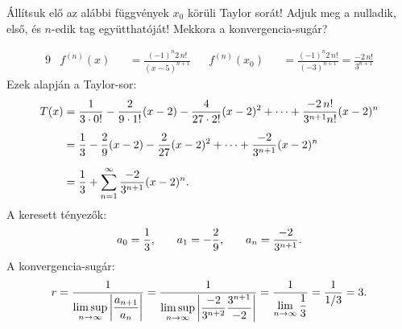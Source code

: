 \documentclass[exercise]{math-standalone}
\begin{document}
\begin{exercise}{%
    Állítsuk elő az alábbi függvények $x_0$ körüli Taylor sorát!
    Adjuk meg a nulladik, első, és $n$-edik tag együtthatóját! Mekkora a
    konvergencia-sugár?
  }
{\begin{enumerate}[a)]
\begin{alignat*}{9}
               & f^{(n)}(x) &  & = \frac{(-1)^n 2 \, n!}{(x-5)^{n+1}} &  & f^{(n)}(x_0) &  & = \frac{(-1)^n 2 \, n!}{(-3)^{n+1}} = \frac{-2 \, n!}{3^{n+1}}
            \end{alignat*}
            Ezek alapján a Taylor-sor:
            \begin{align*}
              T(x)
               & = \frac{1}{3 \cdot 0!}
              - \frac{2}{9 \cdot 1!} (x - 2)
              - \frac{4}{27\cdot 2!} (x - 2)^2
              + \dots
              + \frac{-2 \, n!}{3^{n+1} n!} (x - 2)^n
              \\[2mm]
               & = \frac{1}{3}
              - \frac{2}{9} (x - 2)
              - \frac{2}{27} (x - 2)^2
              + \dots
              + \frac{-2}{3^{n+1}} (x - 2)^n
              \\[2mm]
               & = \frac{1}{3}
              + \sum_{n = 1}^\infty \frac{-2}{3^{n+1}} (x - 2)^n
              \text.
            \end{align*}
            A keresett tényezők:
            \[
              a_0 = \frac{1}{3}
              \text, \qquad
              a_1 = -\frac{2}{9}
              \text, \qquad
              a_n = \frac{-2}{3^{n+1}}
              \text.
            \]
            A konvergencia-sugár:
            \[
              r
              = \frac{1}{\displaystyle\limsup_{n \rightarrow \infty} \left|
                \dfrac{a_{n+1}}{a_n}
                \right|
              }
              = \frac{1}{\displaystyle\limsup_{n \rightarrow \infty} \left|
                \dfrac{-2}{3^{n+2}} \dfrac{3^{n+1}}{-2}
                \right|
              }
              = \frac{1}{\displaystyle\lim_{n \rightarrow \infty}\dfrac{1}{3}}
              = \frac{1}{1/3}
              = 3
              \text.
            \]


\end{enumerate}}
\end{exercise}
\end{document}
